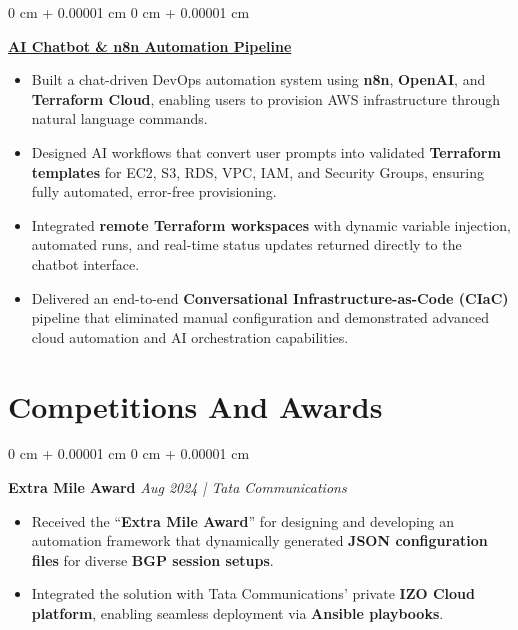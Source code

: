 \documentclass[10pt, letterpaper]{article}
\newenvironment{highlights}{
    \begin{itemize}[
        topsep=0.10 cm,
        parsep=0.10 cm,
        partopsep=0pt,
        itemsep=0pt,
        leftmargin=0 cm + 10pt
    ]
}{
    \end{itemize}
} %
\newenvironment{onecolentry}{
    \begin{adjustwidth}{
        0 cm + 0.00001 cm
    }{
        0 cm + 0.00001 cm
    }
}{
    \end{adjustwidth}
} %
\begin{document}
\begin{onecolentry}
    \textbf{\href{https://github.com/sayakr428/cloud-butler-infra}{AI Chatbot \& n8n Automation Pipeline}}
    \begin{highlights}
        \item Built a chat-driven DevOps automation system using \textbf{n8n}, \textbf{OpenAI}, and \textbf{Terraform Cloud}, enabling users to provision AWS infrastructure through natural language commands.
        \item Designed AI workflows that convert user prompts into validated \textbf{Terraform templates} for EC2, S3, RDS, VPC, IAM, and Security Groups, ensuring fully automated, error-free provisioning.
        \item Integrated \textbf{remote Terraform workspaces} with dynamic variable injection, automated runs, and real-time status updates returned directly to the chatbot interface.
        \item Delivered an end-to-end \textbf{Conversational Infrastructure-as-Code (CIaC)} pipeline that eliminated manual configuration and demonstrated advanced cloud automation and AI orchestration capabilities.
    \end{highlights}
\end{onecolentry}

    \section{ Competitions And Awards}
        \begin{onecolentry}
    \textbf{Extra Mile Award} \hfill \textit{Aug 2024 | Tata Communications}
    \begin{highlights}
        \item Received the “\textbf{Extra Mile Award}” for designing and developing an automation framework that dynamically generated \textbf{JSON configuration files} for diverse \textbf{BGP session setups}.
        \item Integrated the solution with Tata Communications’ private \textbf{IZO Cloud platform}, enabling seamless deployment via \textbf{Ansible playbooks}.
    \end{highlights}
\end{onecolentry}
\end{document}
